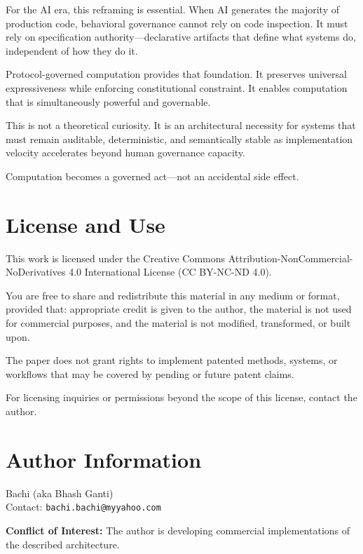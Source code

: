 \documentclass[11pt,a4paper]{article}
\begin{document}
For the AI era, this reframing is essential. When AI generates the majority of production code, behavioral governance cannot rely on code inspection. It must rely on specification authority---declarative artifacts that define what systems do, independent of how they do it.

Protocol-governed computation provides that foundation. It preserves universal expressiveness while enforcing constitutional constraint. It enables computation that is simultaneously powerful and governable.

This is not a theoretical curiosity. It is an architectural necessity for systems that must remain auditable, deterministic, and semantically stable as implementation velocity accelerates beyond human governance capacity.

Computation becomes a governed act---not an accidental side effect.



\section*{License and Use}

This work is licensed under the Creative Commons Attribution-NonCommercial-NoDerivatives 4.0 International License (CC BY-NC-ND 4.0).

You are free to share and redistribute this material in any medium or format, provided that: appropriate credit is given to the author, the material is not used for commercial purposes, and the material is not modified, transformed, or built upon.

The paper does not grant rights to implement patented methods, systems, or workflows that may be covered by pending or future patent claims.

For licensing inquiries or permissions beyond the scope of this license, contact the author.

\section*{Author Information}

\noindent Bachi (aka Bhash Ganti)\\
Contact: \texttt{bachi.bachi@myyahoo.com}

\noindent\textbf{Conflict of Interest:} The author is developing commercial implementations of the described architecture.
\end{document}
